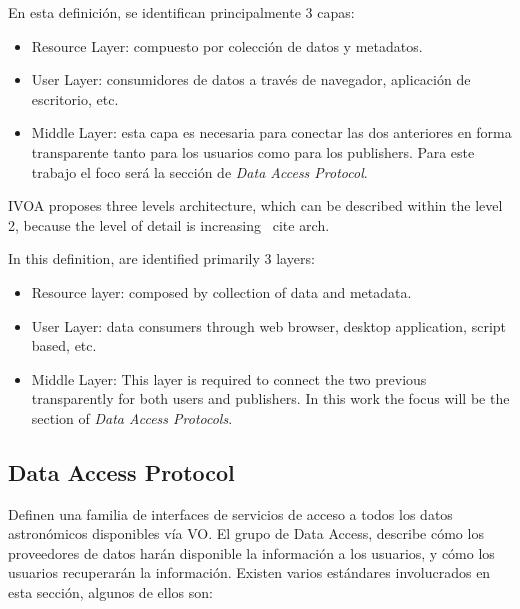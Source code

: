 En esta definición, se identifican principalmente 3 capas:
\begin{itemize}
	\item Resource Layer: compuesto por colección de datos y metadatos.
	\item User Layer: consumidores de datos a través de navegador,
aplicación de escritorio, etc.
	\item Middle Layer: esta capa es necesaria para conectar las dos
anteriores en forma transparente tanto para los usuarios como para los
publishers. Para este trabajo el foco será la sección de \emph{Data Access Protocol}.
\end{itemize}

IVOA proposes three levels architecture, which can be described within the
level 2, because the level of detail is increasing \ cite {arch}.

In this definition, are identified primarily 3 layers:
\begin{itemize}
	\item Resource layer: composed by collection of data and metadata.
	\item User Layer: data consumers through web browser, desktop application, script based, etc.
	\item Middle Layer: This layer is required to connect the two previous
transparently for both users and publishers. In this work the focus will be the
section of \emph{Data Access Protocols}.
\end{itemize}

\subsection{Data Access Protocol}

Definen una familia de interfaces de servicios de acceso a todos los datos
astronómicos disponibles vía VO.  El grupo de Data Access, describe cómo los
proveedores de datos harán disponible la información a los usuarios, y cómo los
usuarios recuperarán la información. Existen varios estándares involucrados
en esta sección, algunos de ellos son:

